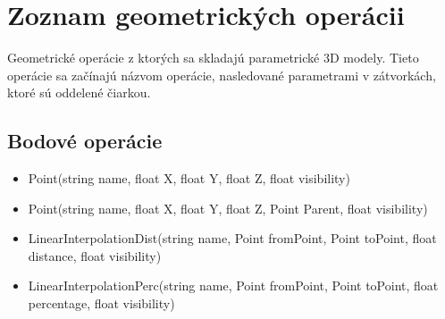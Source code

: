 \chapter{Zoznam geometrických operácii}
\label{Priloha:zoznamGeometrickychOperacii}
Geometrické operácie z ktorých sa skladajú parametrické 3D modely. Tieto operácie sa začínajú názvom operácie, nasledované parametrami v zátvorkách, ktoré sú oddelené čiarkou.

\section{Bodové operácie}
\begin{itemize}


		\item Point(string name, float X, float Y, float Z, float visibility) 
		\item Point(string name, float X, float Y, float Z, Point Parent, float visibility) 

		\item LinearInterpolationDist(string name, Point fromPoint, Point toPoint, float distance, float visibility)
		
		\item LinearInterpolationPerc(string name, Point fromPoint, Point toPoint, float percentage, float visibility)


\end{itemize}

